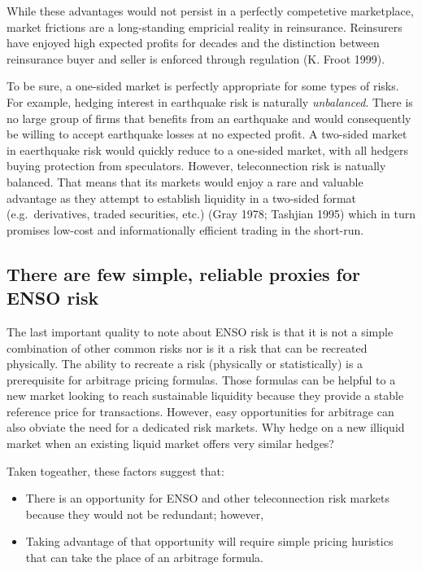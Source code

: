 \documentclass[article]{jss}
\begin{document}
While these advantages would not persist in a perfectly competetive
marketplace, market frictions are a long-standing empricial reality in
reinsurance. Reinsurers have enjoyed high expected profits for decades
and the distinction between reinsurance buyer and seller is enforced
through regulation (K. Froot 1999).

To be sure, a one-sided market is perfectly appropriate for some types
of risks. For example, hedging interest in earthquake risk is naturally
\emph{unbalanced}. There is no large group of firms that benefits from
an earthquake and would consequently be willing to accept earthquake
losses at no expected profit. A two-sided market in eaerthquake risk
would quickly reduce to a one-sided market, with all hedgers buying
protection from speculators. However, teleconnection risk is natually
balanced. That means that its markets would enjoy a rare and valuable
advantage as they attempt to establish liquidity in a two-sided format
(e.g.~derivatives, traded securities, etc.) (Gray 1978; Tashjian 1995)
which in turn promises low-cost and informationally efficient trading in
the short-run.

\subsection{There are few simple, reliable proxies for ENSO
risk}\label{there-are-few-simple-reliable-proxies-for-enso-risk}

The last important quality to note about ENSO risk is that it is not a
simple combination of other common risks nor is it a risk that can be
recreated physically. The ability to recreate a risk (physically or
statistically) is a prerequisite for arbitrage pricing formulas. Those
formulas can be helpful to a new market looking to reach sustainable
liquidity because they provide a stable reference price for
transactions. However, easy opportunities for arbitrage can also obviate
the need for a dedicated risk markets. Why hedge on a new illiquid
market when an existing liquid market offers very similar hedges?

Taken togeather, these factors suggest that:

\begin{itemize}
\itemsep1pt\parskip0pt
\item
  There is an opportunity for ENSO and other teleconnection risk markets
  because they would not be redundant; however,
\item
  Taking advantage of that opportunity will require simple pricing
  huristics that can take the place of an arbitrage formula.
\end{itemize}
\end{document}
